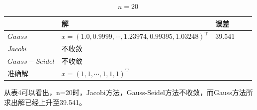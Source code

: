 \documentclass[UTF8]{ctexart}
\begin{document}
\begin{table}[h]
    \vspace{5pt}
    \centering
    \begin{tabular}{lllll}
        \hline
         & 解&误差\\
        \hline
        $Gauss$  & $x = (1.0, 0.9999, \cdots, 1.23974, 0.99395, 1.03248)^{\mathrm{T}}$ &39.541\\
        $Jacobi$  & 不收敛 &\\
        $Gauss-Seidel$ & 不收敛 &\\
        准确解 & $x = (1, 1, \cdots,1, 1, 1)^{\mathrm{T}}$ & \\
        \hline       
    \end{tabular}
    \caption{$n = 20$}
\end{table}
从表4可以看出，n=20时，Jacobi方法，Gauss-Seidel方法不收敛，而Gauss方法所求出解已经上升至39.541。
\end{document}
